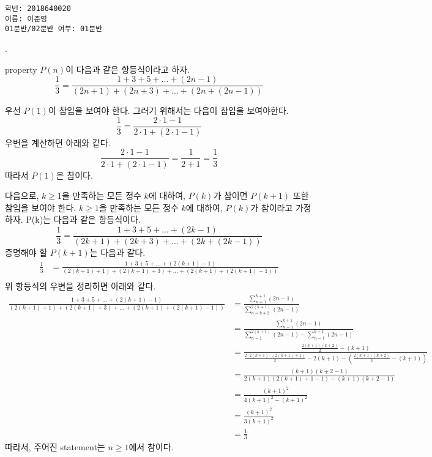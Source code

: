 \documentclass{article}
\begin{document}
\begin{verbatim}
학번: 2018640020
이름: 이준영
01분반/02분반 여부: 01분반
\end{verbatim}
. 
\begin{addmargin}[1em]{2em}

property $P(n)$이 다음과 같은 항등식이라고 하자. 
\[\frac{1}{3} = \frac{1+3+5+...+(2n-1)}{(2n+1)+(2n+3)+...+(2n+(2n-1))}\]

우선 $P(1)$이 참임을 보여야 한다. 그러기 위해서는 다음이 참임을 보여야한다.
\[\frac{1}{3} = \frac{2\cdot 1 - 1}{2\cdot 1 + (2\cdot 1 - 1)}\]
우변을 계산하면 아래와 같다.
\[\frac{2\cdot 1 - 1}{2\cdot 1 + (2\cdot 1 - 1)} = \frac{1}{2 + 1} = \frac{1}{3}\] 
따라서 $P(1)$은 참이다.
\newline

다음으로, $k\ge 1$을 만족하는 모든 정수 $k$에 대하여, $P(k)$가 참이면 $P(k+1)$ 또한 참임을 보여야 한다. 
$k\ge 1$을 만족하는 모든 정수 $k$에 대하여, $P(k)$가 참이라고 가정하자. P(k)는 다음과 같은 항등식이다.
\[\frac{1}{3} = \frac{1+3+5+...+(2k-1)}{(2k+1)+(2k+3)+...+(2k+(2k-1))}\]
증명해야 할 $P(k+1)$는 다음과 같다.
\begin{align*}
\frac{1}{3} &= \frac{1+3+5+...+(2(k+1)-1)}{(2(k+1)+1)+(2(k+1)+3)+...+(2(k+1)+(2(k+1)-1))} \\
\end{align*}
위 항등식의 우변을 정리하면 아래와 같다.
\begin{align*}
\frac{1+3+5+...+(2(k+1)-1)}{(2(k+1)+1)+(2(k+1)+3)+...+(2(k+1)+(2(k+1)-1))} &= \frac{\sum_{n=1}^{k+1}(2n-1)}{\sum_{n=k+2}^{2(k+1)}(2n-1)} \\
&= \frac{\sum_{n=1}^{k+1}(2n-1)}{\sum_{n=1}^{2(k+1)}(2n-1) - \sum_{n=1}^{k+1}(2n-1)} \\
&= \frac{\frac{2(k+1)(k+2)}{2} - (k+1)}{\frac{2\cdot 2(k+1)\cdot (2(k+1)+1)}{2} - 2(k+1) - (\frac{2(k+1)(k+2)}{2} - (k+1))} \\
&= \frac{(k+1)(k+2-1)}{2(k+1)(2(k+1)+1 - 1)-(k+1)(k+2-1)} \\
&= \frac{(k+1)^2}{4(k+1)^2-(k+1)^2} \\
&= \frac{(k+1)^2}{3(k+1)^2} \\
&= \frac{1}{3}
\end{align*}
따라서, 주어진 statement는 $n\ge 1$에서 참이다. 
\end{addmargin}
\bigskip
\end{document}
